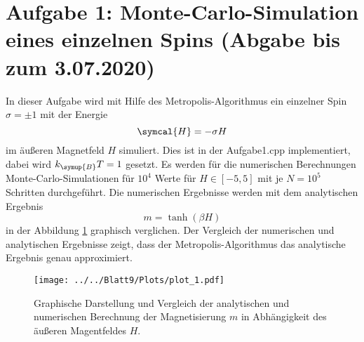 \section*{Aufgabe 1: Monte-Carlo-Simulation eines einzelnen Spins (Abgabe bis zum 3.07.2020)}

In dieser Aufgabe wird mit Hilfe des Metropolis-Algorithmus ein einzelner Spin $\sigma=\pm1$ mit der Energie
\begin{equation*}
  \symcal{H}=-\sigma H
\end{equation*}
im äußeren Magnetfeld $H$ simuliert. Dies ist in der Aufgabe1.cpp implementiert, dabei wird $k_{\symup{B}} T=1$ gesetzt.
Es werden für die numerischen Berechnungen Monte-Carlo-Simulationen für $10^4$ Werte für $H\in[-5,5]$ mit je $N=10^5$ Schritten durchgeführt.
Die numerischen Ergebnisse werden mit dem analytischen Ergebnis
\begin{equation*}
  m=\tanh\left(\beta H \right)
\end{equation*}
in der Abbildung \ref{Magnetisierung} graphisch verglichen.
Der Vergleich der numerischen und analytischen Ergebnisse zeigt, dass der Metropolis-Algorithmus das analytische Ergebnis genau approximiert.

\begin{figure}[H]
\texttt{[image: ../../Blatt9/Plots/plot\_1.pdf]}
\centering
\caption{Graphische Darstellung und Vergleich der analytischen und numerischen Berechnung der Magnetisierung $m$ in Abhängigkeit des äußeren Magentfeldes $H$.}
\label{Magnetisierung}
\end{figure}
